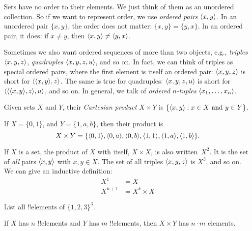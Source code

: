 \documentclass[../../../include/open-logic-section]{subfiles}
\begin{document}

\begin{explain}
Sets have no order to their elements. We just think of them as an
unordered collection. So if we want to represent order, we use
\emph{ordered pairs} $\langle x, y \rangle$. In an unordered pair $\{x, y\}$,
the order does not matter: $\{x, y\} = \{y, x\}$. In an ordered pair,
it does: if $x \neq y$, then $\langle x, y \rangle \neq \langle y, x \rangle$.

Sometimes we also want ordered sequences of more than two objects,
e.g., \emph{triples} $\langle x, y, z \rangle$, \emph{quadruples} $\langle x,
  y, z, u \rangle$, and so on.  In fact, we can think of triples as special
ordered pairs, where the first element is itself an ordered pair:
$\langle x, y, z \rangle$ is short for $\langle \langle x, y \rangle,z \rangle$. The same is
true for quadruples: $\langle x,y,z,u \rangle$ is short for
$\langle \langle \langle x,y \rangle,z \rangle,u \rangle$, and so on. In general, we talk of
\emph{ordered $n$-tuples} $\langle x_1, \dots, x_n \rangle$.
\end{explain}

\begin{defn}
Given sets $X$ and $Y$, their \emph{Cartesian product} $X \times Y$ is
$\{ \langle x, y \rangle : x \in X \text{ and } y \in Y \}$.
\end{defn}

\begin{ex}
If $X = \{0, 1\}$, and $Y = \{1, a, b\}$, then their product is
\[
X \times Y = \{ \langle 0, 1 \rangle, \langle 0, a \rangle, \langle 0, b \rangle,
    \langle 1, 1 \rangle, \langle 1, a \rangle, \langle 1, b \rangle \}.
\]
\end{ex}

\begin{ex}
If $X$ is a set, the product of $X$ with itself, $X \times X$, is also
written~$X^2$. It is the set of \emph{all} pairs $\langle x, y \rangle$ with
$x, y \in X$. The set of all triples $\langle x, y, z \rangle$ is $X^3$, and
so on. We can give an inductive definition:
\begin{align*}
  X^1 & = X\\
  X^{k+1} & = X^k \times X
\end{align*}
\end{ex}

\begin{prob}
List all !!{element}s of $\{1, 2, 3\}^3$.
\end{prob}

\begin{prop}
If $X$ has $n$ !!{element}s and $Y$ has $m$ !!{element}s, then $X
\times Y$ has $n\cdot m$ elements.
\end{prop}
\end{document}
